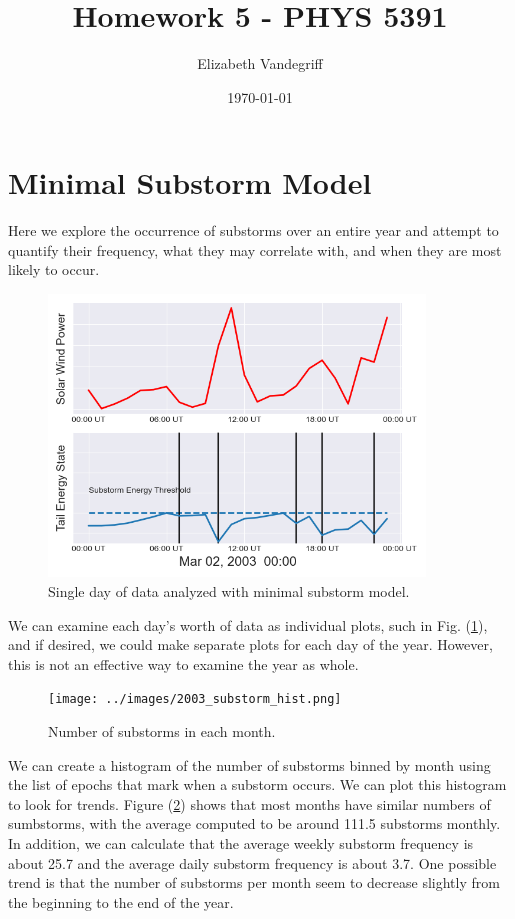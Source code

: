 \documentclass[12pt, letterpaper]{article}
\begin{document}
\title{Homework 5 - PHYS 5391}
\author{Elizabeth Vandegriff}
\date{\today}

\maketitle
\newpage


\section{Minimal Substorm Model}

Here we explore the occurrence of substorms over an entire year and attempt to quantify their frequency, what they may correlate with, and when they are most likely to occur.

\begin{figure}[!ht]
  \centering
  \includegraphics[width=10cm]{../imf20030302.png}
  \caption{Single day of data analyzed with minimal substorm model.}
  \label{fig:sub}
\end{figure}


We can examine each day's worth of data as individual plots, such in Fig. (\ref{fig:sub}), and if desired, we could make separate plots for each day of the year. However, this is not an effective way to examine the year as whole.

\begin{figure}[!ht]
  \centering
  \texttt{[image: ../images/2003\_substorm\_hist.png]}
  \caption{Number of substorms in each month.}
  \label{fig:hist}
\end{figure}

We can create a histogram of the number of substorms binned by month using the list of epochs that mark when a substorm occurs. We can plot this histogram to look for trends. Figure (\ref{fig:hist}) shows that most months have similar numbers of sumbstorms, with the average computed to be around 111.5 substorms monthly. In addition, we can calculate that the average weekly substorm frequency is about 25.7 and the average daily substorm frequency is about 3.7. One possible trend is that the number of substorms per month seem to decrease slightly from the beginning to the end of the year.
\end{document}
